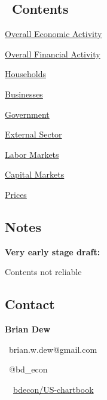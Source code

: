 \documentclass{report}
\begin{document}
\begin{minipage}{0.34\textwidth}
\subsection*{\hyperlink{toc}{\faList}\color{black!70} \ {\seriffont Contents}}
\hypertarget{toc}{}
\begin{description}

\item {\hyperref[sec:oea]{Overall Economic Activity}}

\item {\hyperref[sec:ofa]{Overall Financial Activity}}

\item {\hyperref[sec:hh]{Households}}

\item {\hyperref[sec:bus]{Businesses}}

\item {\hyperref[sec:gov]{Government}}

\item {\hyperref[sec:ext]{External Sector}}

\item {\hyperref[sec:lab]{Labor Markets}}

\item {\hyperref[sec:cap]{Capital Markets}}

\item {\hyperref[sec:pr]{Prices}}

\end{description}
\end{minipage}
\hspace{6mm} \begin{minipage}{0.36\textwidth}
\subsection*{ {\color{red} \faExclamationTriangle} \color{black!70} {\seriffont Notes}}

{\color{red} \textbf{Very early stage draft:}} 

Contents not reliable 


\subsection*{{\color{gray} \faUser} \color{black!70} {\seriffont Contact}}

\textbf{Brian Dew} \ 

{\color{gray} \faEnvelope} \ brian.w.dew@gmail.com \ 

{\color{gray} \faTwitter} \ @bd\_econ \

{\color{gray} \faGithub} \ \ \href{https://github.com/bdecon/US-chartbook}{bdecon/US-chartbook}

\vfill
\end{minipage}
\end{document}
